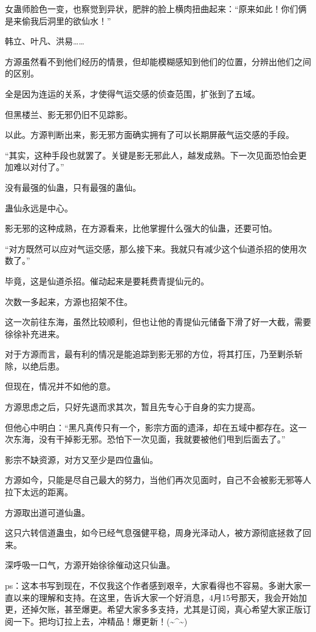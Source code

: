 \begin{this_body}
女蛊师脸色一变，也察觉到异状，肥胖的脸上横肉扭曲起来：“原来如此！你们俩是来偷我后洞里的欲仙水！”

韩立、叶凡、洪易……

方源虽然看不到他们经历的情景，但却能模糊感知到他们的位置，分辨出他们之间的区别。

全是因为连运的关系，才使得气运交感的侦查范围，扩张到了五域。

但黑楼兰、影无邪仍旧不见踪影。

以此。方源判断出来，影无邪方面确实拥有了可以长期屏蔽气运交感的手段。

“其实，这种手段也就罢了。关键是影无邪此人，越发成熟。下一次见面恐怕会更加难以对付了。”

没有最强的仙蛊，只有最强的蛊仙。

蛊仙永远是中心。

影无邪的这种成熟，在方源看来，比他掌握什么强大的仙蛊，还要可怕。

“对方既然可以应对气运交感，那么接下来。我就只有减少这个仙道杀招的使用次数了。”

毕竟，这是仙道杀招。催动起来是要耗费青提仙元的。

次数一多起来，方源也招架不住。

这一次前往东海，虽然比较顺利，但也让他的青提仙元储备下滑了好一大截，需要徐徐补充进来。

对于方源而言，最有利的情况是能追踪到影无邪的方位，将其打压，乃至剿杀斩除，以绝后患。

但现在，情况并不如他的意。

方源思虑之后，只好先退而求其次，暂且先专心于自身的实力提高。

但他心中明白：“黑凡真传只有一个，影宗方面的遗泽，却在五域中都存在。这一次东海，没有干掉影无邪。恐怕下一次见面，我就要被他们甩到后面去了。”

影宗不缺资源，对方又至少是四位蛊仙。

方源如今，只能是尽自己最大的努力，当他们再次见面时，自己不会被影无邪等人拉下太远的距离。

方源取出道可道仙蛊。

这只六转信道蛊虫，如今已经气息强健平稳，周身光泽动人，被方源彻底拯救了回来。

深呼吸一口气，方源开始徐徐催动这只仙蛊。

ps：这本书写到现在，不仅我这个作者感到艰辛，大家看得也不容易。多谢大家一直以来的理解和支持。在这里，告诉大家一个好消息，4月15号那天，我会开始加更，还掉欠账，甚至爆更。希望大家多多支持，尤其是订阅，真心希望大家正版订阅一下。把均订拉上去，冲精品！爆更新！(\~{}\^{}\~{})

\end{this_body}

